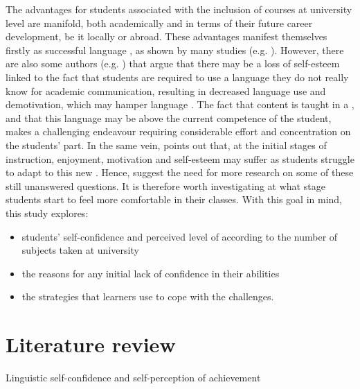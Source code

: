 \documentclass[output=paper]{langsci/langscibook}
\begin{document}
The advantages for students associated with the inclusion of  courses at university level are manifold, both academically and in terms of their future career development, be it locally or abroad. These advantages manifest themselves firstly as successful language , as shown by many studies (e.g. \citealt{CoyleEtAl2010,RuizdeZarobe2011,Pérez-Vidal2013,Gené-GilEtAl2015}). However,  there are also some authors  (e.g. \citealt{Seikkula-Leino2007,Hunt2011,Bruton2013})  that argue that there may be a loss of self-esteem linked to the fact that students are required to use a language they do not really know for academic communication, resulting in decreased language use and demotivation, which may hamper language . The fact that content is taught in a , and that this language may be above the current competence of the student, makes  a challenging endeavour requiring considerable effort and concentration on the students’ part. In the same vein, \citet{Hood2010} points out that, at the initial stages of instruction, enjoyment, motivation and self-esteem may suffer as students struggle to adapt to this new . Hence, \citet{CenozEtAl2014} suggest the need for more research on some of these still unanswered questions. It is therefore worth investigating at what stage students start to feel more comfortable in their  classes. With this goal in mind, this study explores:


\begin{itemize}
\item students’  self-confidence and perceived level of  according to the number of  subjects taken at university
\item the reasons for any initial lack of confidence in their abilities
\item the strategies that learners use to cope with the challenges.
\end{itemize}

\section{Literature review}


{Linguistic self-confidence and self-perception of  achievement}
\end{document}
